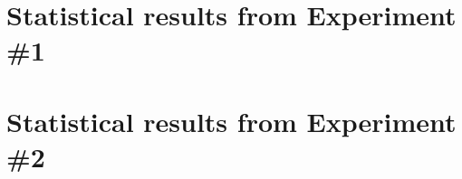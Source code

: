 \section{Statistical results from Experiment \#1}











\section{Statistical results from Experiment \#2}

























